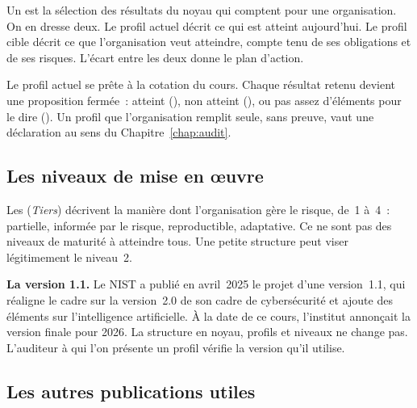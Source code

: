 Un  est la sélection des résultats du noyau qui comptent
pour une organisation. On en dresse deux. Le profil actuel décrit ce qui est
atteint aujourd'hui. Le profil cible décrit ce que l'organisation veut
atteindre, compte tenu de ses obligations et de ses risques. L'écart entre
les deux donne le plan d'action.

Le profil actuel se prête à la cotation du cours. Chaque résultat retenu
devient une proposition fermée~: atteint (\OUI{}), non atteint (\NON{}), ou
pas assez d'éléments pour le dire (\NEK{}). Un profil que l'organisation
remplit seule, sans preuve, vaut une déclaration au sens du
Chapitre~\ref{chap:audit}.

\subsection{Les niveaux de mise en œuvre}

Les  (\textit{Tiers}) décrivent la manière dont
l'organisation gère le risque, de~1 à~4~: partielle, informée par le risque,
reproductible, adaptative. Ce ne sont pas des niveaux de maturité à
atteindre tous. Une petite structure peut viser légitimement le niveau~2.

\begin{boxinfo}
\textbf{La version 1.1.} Le NIST a publié en avril~2025 le projet d'une
version~1.1, qui réaligne le cadre sur la version~2.0 de son cadre de
cybersécurité et ajoute des éléments sur l'intelligence artificielle. À la
date de ce cours, l'institut annonçait la version finale pour 2026. La
structure en noyau, profils et niveaux ne change pas. L'auditeur à qui l'on
présente un profil vérifie la version qu'il utilise.
\end{boxinfo}

\subsection{Les autres publications utiles}


